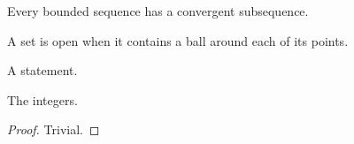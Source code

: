 \documentclass{beamer}
\begin{document}
\begin{frame}
\begin{theorem}
Every bounded sequence has a convergent subsequence.
\end{theorem}
\begin{definition}
A set is open when it contains a ball around each of its points.
\end{definition}
\begin{theorem}[Euler]
A statement.
\end{theorem}
\begin{example}
The integers.
\end{example}
\begin{proof}
Trivial.
\end{proof}
\end{frame}
\end{document}
